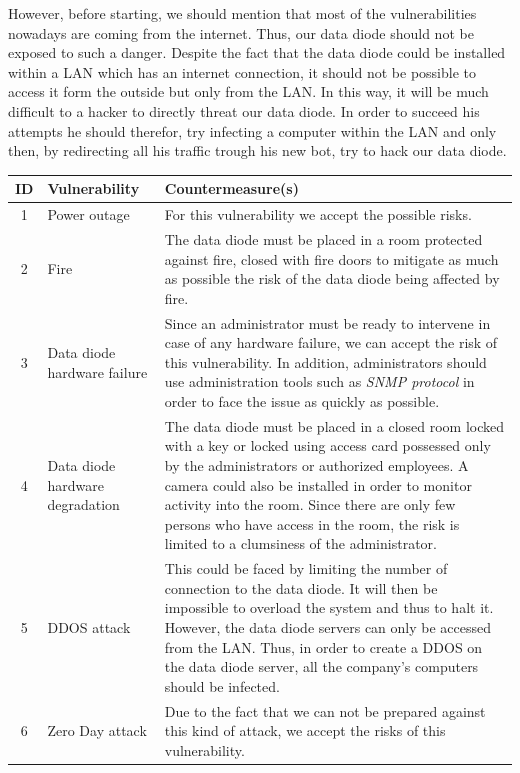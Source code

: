 \documentclass[a4paper,10pt]{article}
\begin{document}
However, before starting, we should mention that most of the vulnerabilities nowadays are coming from the internet. Thus, our data diode should not be exposed to such a danger. Despite the fact that the data diode could be installed within a LAN which has an internet connection, it should not be possible to access it form the outside but only from the LAN. In this way, it will be much difficult to a hacker to directly threat our data diode. In order to succeed his attempts he should therefor, try infecting a computer within the LAN and only then, by redirecting all his traffic trough his new bot, try to hack our data diode.
\begin{longtable}{|c|p{2.5cm}|p{12cm}|}
\hline
\textbf{ID}& \textbf{Vulnerability}  & \textbf{Countermeasure(s)} \\
\hline
1 & Power outage  & For this vulnerability we accept the possible risks. \\
\hline
2 & Fire & The data diode must be placed in a room protected against fire, closed with fire doors to mitigate as much as possible the risk of the data diode being affected by fire.  \\
\hline
3 & Data diode hardware failure & Since an administrator must be ready to intervene in case of any hardware failure, we can accept the risk of this vulnerability. In addition, administrators should use administration tools such as \emph{SNMP protocol} in order to face the issue as quickly as possible. \\
\hline
4 & Data diode hardware degradation & The data diode must be placed in a closed room locked with a key or locked using access card possessed only by the administrators or authorized employees. A camera could also be installed in order to monitor activity into the room. Since there are only few persons who have access in the room, the risk is limited to a clumsiness of the administrator. \\
\hline
5 & DDOS attack & This could be faced by limiting the number of connection to the data diode. It will then be impossible to overload the system and thus to halt it. However, the data diode servers can only be accessed from the LAN. Thus, in order to create a DDOS on the data diode server, all the company's computers should be infected.  \\
\hline
6 & Zero Day attack & Due to the fact that we can not be prepared against this kind of attack, we accept the risks of this vulnerability.  \\

\end{longtable}
\end{document}
